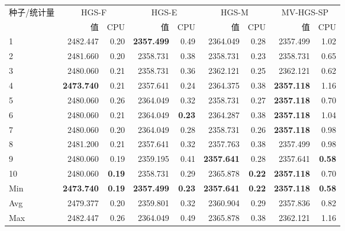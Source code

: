 \begin{tabular}{@{}lrrrrrrrr@{}}
\toprule
种子/统计量 & \multicolumn{2}{c}{HGS-F} & \multicolumn{2}{c}{HGS-E} & \multicolumn{2}{c}{HGS-M} & \multicolumn{2}{c}{MV-HGS-SP}\\
 & 值 & CPU & 值 & CPU & 值 & CPU & 值 & CPU\\
\midrule
1 & 2482.447 & 0.20 & \textbf{2357.499} & 0.49 & 2364.049 & 0.28 & 2357.499 & 1.02 \\
2 & 2481.660 & 0.20 & 2358.731 & 0.38 & 2358.731 & 0.23 & 2358.731 & 0.65 \\
3 & 2480.060 & 0.21 & 2358.731 & 0.36 & 2362.121 & 0.25 & 2362.121 & 0.62 \\
4 & \textbf{2473.740} & 0.21 & 2357.641 & 0.24 & 2364.375 & 0.38 & \textbf{2357.118} & 1.16 \\
5 & 2480.060 & 0.26 & 2364.049 & 0.32 & 2358.731 & 0.27 & \textbf{2357.118} & 0.70 \\
6 & 2480.060 & 0.21 & 2364.049 & \textbf{0.23} & 2364.287 & 0.38 & \textbf{2357.118} & 1.04 \\
7 & 2480.060 & 0.20 & 2364.049 & 0.28 & 2358.731 & 0.26 & \textbf{2357.118} & 0.98 \\
8 & 2481.200 & 0.21 & 2357.641 & 0.32 & 2357.763 & 0.38 & 2357.499 & 0.98 \\
9 & 2480.060 & 0.19 & 2359.195 & 0.41 & \textbf{2357.641} & 0.28 & 2357.641 & \textbf{0.58} \\
10 & 2480.060 & \textbf{0.19} & 2358.731 & 0.29 & 2365.878 & \textbf{0.22} & \textbf{2357.118} & 0.70 \\
Min & \textbf{2473.740} & \textbf{0.19} & \textbf{2357.499} & \textbf{0.23} & \textbf{2357.641} & \textbf{0.22} & \textbf{2357.118} & \textbf{0.58} \\
Avg & 2479.377 & 0.20 & 2359.801 & 0.32 & 2360.904 & 0.29 & 2357.836 & 0.82 \\
Max & 2482.447 & 0.26 & 2364.049 & 0.49 & 2365.878 & 0.38 & 2362.121 & 1.16 \\
\bottomrule
\end{tabular}
